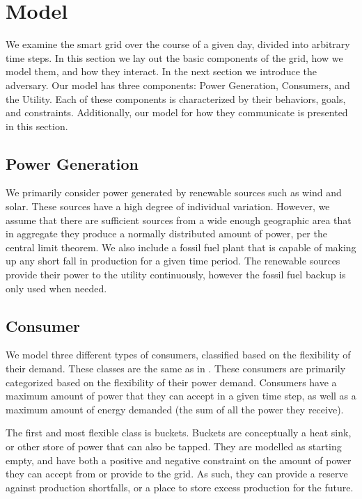\documentclass[conference]{IEEEtran}
\begin{document}
\section{Model}
\label{Model}

We examine the smart grid over the course of a given day, divided into arbitrary time steps. In this section we lay out the basic components of the grid, how we model them, and how they interact. In the next section we introduce the adversary. Our model has three components: Power Generation, Consumers, and the Utility. Each of these components is characterized by their behaviors, goals, and constraints. Additionally, our model for how they communicate is presented in this section. 

\subsection{Power Generation}
\label{Power Generation}

We primarily consider power generated by renewable sources such as wind and solar. These sources have a high degree of individual variation. However, we assume that there are sufficient sources from a wide enough geographic area that in aggregate they produce a normally distributed amount of power, per the central limit theorem. We also include a fossil fuel plant that is capable of making up any short fall in production for a given time period. The renewable sources provide their power to the utility continuously, however the fossil fuel backup is only used when needed.

\subsection{Consumer}
\label{Consumer}

We model three different types of consumers, classified based on the flexibility of their demand. These classes are the same as in \cite{petersen2013taxonomy}. These consumers are primarily categorized based on the flexibility of their power demand. Consumers have a maximum amount of power that they can accept in a given time step, as well as a maximum amount of energy demanded (the sum of all the power they receive).

The first and most flexible class is buckets. Buckets are conceptually a heat sink, or other store of power that can also be tapped. They are modelled as starting empty, and have both a positive and negative constraint on the amount of power they can accept from or provide to the grid. As such, they can provide a reserve against production shortfalls, or a place to store excess production for the future.
\end{document}
